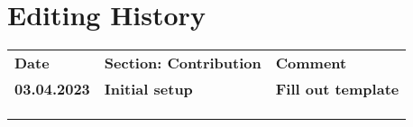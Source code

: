 \cleardoublepage
{}
\chapter*{Editing History}
\label{cha:history}


\begin{longtable}{ |p{2cm}|p{5.5cm}|p{6cm}|}
    \hline
           \textbf{Date} & \textbf{Section: Contribution} & \textbf{Comment} \\
           \textbf{03.04.2023} & \textbf{Initial setup} & \textbf{Fill out template} \\
     \hline
         &   &    \\
         &   &    \\
         &   &    \\
     \hline
    \end{longtable}
     
